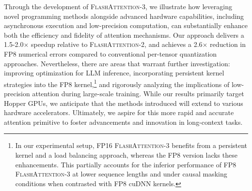 Through the development of \textsc{FlashAttention-3}, we illustrate how leveraging novel programming methods alongside advanced hardware capabilities, including asynchronous execution and low-precision computation, can substantially enhance both the efficiency and fidelity of attention mechanisms. Our approach delivers a 1.5-2.0$\times$ speedup relative to \textsc{FlashAttention-2}, and achieves a 2.6$\times$ reduction in FP8 numerical errors compared to conventional per-tensor quantization approaches. Nevertheless, there are areas that warrant further investigation: improving optimization for LLM inference, incorporating persistent kernel strategies into the FP8 kernel,\footnote{In our experimental setup, FP16 \textsc{FlashAttention-3} benefits from a persistent kernel and a load balancing approach, whereas the FP8 version lacks these enhancements. This partially accounts for the inferior performance of FP8 \textsc{FlashAttention-3} at lower sequence lengths and under causal masking conditions when contrasted with FP8 cuDNN kernels.} and rigorously analyzing the implications of low-precision attention during large-scale training. While our results primarily target Hopper GPUs, we anticipate that the methods introduced will extend to various hardware accelerators. Ultimately, we aspire for this more rapid and accurate attention primitive to foster advancements and innovation in long-context tasks.

